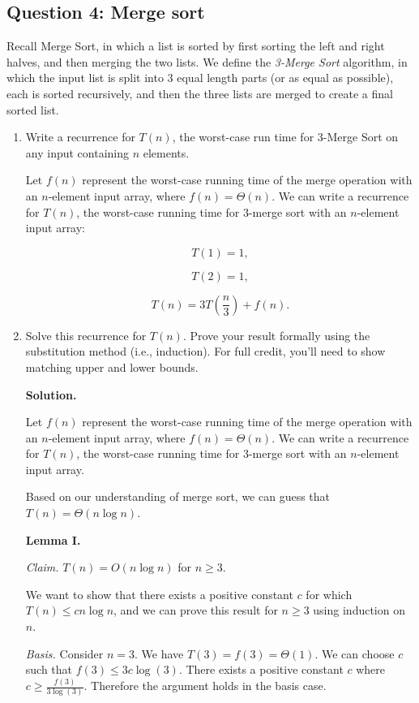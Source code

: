 \subsection*{Question 4: Merge sort}
Recall Merge Sort, in which a list is sorted by first sorting the left and right halves, and then merging the two lists. 
We define the \textit{3-Merge Sort} algorithm, in which the input list is split into $3$
equal length parts (or as equal as possible), each is sorted recursively, and then the three lists are merged to create a final sorted list. 
\begin{enumerate}
\item Write a recurrence for $T(n)$, the worst-case run time for 3-Merge Sort on any input containing $n$ elements.

Let $f(n)$ represent the worst-case running time of the merge operation with an $n$-element input array, where $f(n)=\Theta(n)$. We can write a recurrence for $T(n)$, the worst-case running time for 3-merge sort with an $n$-element input array:

\[T(1)=1,\]

\[T(2)=1,\]

\[T(n)=3T\left(\frac{n}{3}\right)+f(n).\]

\item Solve this recurrence for $T(n)$. Prove your result formally using the substitution method (i.e., induction). For full credit, you'll need to show matching upper and lower bounds.

\textbf{Solution. }

Let $f(n)$ represent the worst-case running time of the merge operation with an $n$-element input array, where $f(n)=\Theta(n)$. We can write a recurrence for $T(n)$, the worst-case running time for 3-merge sort with an $n$-element input array.

Based on our understanding of merge sort, we can guess that $T(n)=\Theta(n\log n)$.

\textbf{Lemma I. }

\textit{Claim. }$T(n)=O(n\log n)$ for $n\geq 3$.

We want to show that there exists a positive constant $c$ for which $T(n)\leq cn\log n$, and we can prove this result for $n\geq 3$ using induction on $n$.

\textit{Basis. }Consider $n=3$. We have $T(3)=f(3)=\Theta(1)$. We can choose $c$ such that $f(3)\leq 3c\log(3)$. There exists a positive constant $c$ where $c\geq\frac{f(3)}{3\log(3)}$. Therefore the argument holds in the basis case.\\


\end{enumerate}
